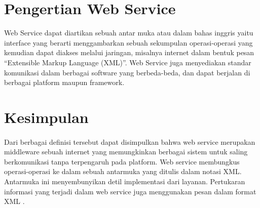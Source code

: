 \documentclass[12pt]{journal}
\begin{document}
\section{Pengertian Web Service}

Web Service dapat diartikan sebuah antar muka atau dalam bahas inggris yaitu interface  yang berarti menggambarkan sebuah sekumpulan operasi-operasi yang kemudian dapat diakses melalui jaringan, misalnya internet dalam bentuk pesan “Extensible Markup Language (XML)”. Web Service juga menyediakan standar komunikasi dalam berbagai software yang berbeda-beda, dan dapat berjalan di berbagai platform maupun framework\cite{hartono2013aplikasi}. 

\section{Kesimpulan}

\paragraph{}
Dari berbagai definisi tersebut dapat disimpulkan bahwa web service merupakan middleware sebuah internet yang memungkinkan berbagai sistem untuk saling berkomunikasi tanpa terpengaruh pada platform. Web service membungkus operasi-operasi ke dalam sebuah antarmuka yang ditulis dalam notasi XML. Antarmuka ini menyembunyikan detil implementasi dari layanan. Pertukaran informasi yang terjadi dalam web service juga menggunakan pesan dalam format XML \cite{saputra2integrasi}.
\end{document}
